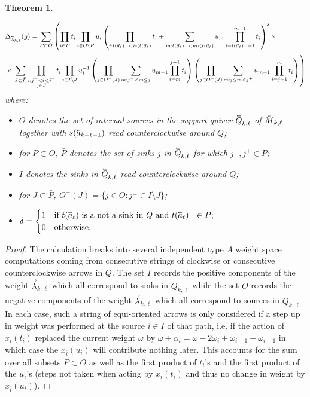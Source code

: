 \documentclass[11pt]{amsart}
\newcommand{\cev}[1]{\reflectbox{\!\ensuremath{\vec{\,\reflectbox{\ensuremath{#1}}}}}}
\newcommand{\scev}[1]{\reflectbox{\scriptsize\!\ensuremath{\vec{\,\reflectbox{\ensuremath{#1}}}}}}
\newtheorem{theorem}{Theorem}[section]
\numberwithin{equation}{section}
\begin{document}
{\begin{theorem}
\begin{enumerate}
      \begin{align}
        &\Delta_{\scev{\lambda}_{k,\ell}}(g)=\sum_{P\subset O}\left(\prod_{i\in P} t_i\prod_{i\in O\setminus P} u_i\left(\prod_{i:t(\vec{a}_\ell)^-<i<t(\vec{a}_\ell)}t_i+\sum_{m:t(\vec{a}_\ell)^-<m<t(\vec{a}_\ell)}u_m\prod_{i=t(\vec{a}_\ell)^-+1}^{m-1} t_i\right)^\delta\times\right.\\
        \nonumber&\times\left.\sum_{J\subset\bar{P}}\prod_{\substack{i:j^-<i<j^+\\j\in J}}t_i\prod_{i\in I\setminus J}u_i^{-1}\left(\prod_{j\in O^-(J)}\sum_{m:j^-<m\le j}u_{m-1}\prod_{i=m}^{j-1} t_i\right)\left(\prod_{j\in O^+(J)}\sum_{m:j\le m<j^+}u_{m+1}\prod_{i=j+1}^{m} t_i\right)\right)
      \end{align}
      where:
      \begin{itemize}
        \item $O$ denotes the set of internal sources in the support quiver $\cev{Q}_{k,\ell}$ of $\cev{M}_{k,\ell}$ together with $s(\cev{a}_{k+\ell-1})$ read counterclockwise around $Q$;
        \item for $P\subset O$, $\bar{P}$ denotes the set of sinks $j$ in $\cev{Q}_{k,\ell}$ for which $j^-,j^+\in P$;
        \item $I$ denotes the sinks in $\cev{Q}_{k,\ell}$ read counterclockwise around $Q$;
        \item for $J\subset\bar{P}$, $O^\pm(J)=\{j\in O:j^\pm\in I\setminus J\}$;
        \item $\delta=\begin{cases}1 & \text{if $t(\cev{a}_\ell)$ is a not a sink in $Q$ and $t(\cev{a}_\ell)^-\in P$;}\\0 & \text{otherwise.}\end{cases}$
      \end{itemize}
    \end{enumerate}
  \end{theorem}
  \begin{proof}
    The calculation breaks into several independent type $A$ weight space computations coming from consecutive strings of clockwise or consecutive counterclockwise arrows in $Q$.  The set $I$ records the positive components of the weight $\vec{\lambda}_{k,\ell}$ which all correspond to sinks in $Q_{k,\ell}$ while the set $O$ records the negative components of the weight $\vec{\lambda}_{k,\ell}$ which all correspond to sources in $Q_{k,\ell}$.  In each case, such a string of equi-oriented arrows is only considered if a step up in weight was performed at the source $i\in I$ of that path, i.e. if the action of $x_i(t_i)$ replaced the current weight $\omega$ by $\omega+\alpha_i=\omega-2\omega_i+\omega_{i-1}+\omega_{i+1}$ in which case the $x_{\bar{i}}(u_i)$ will contribute nothing later.  This accounts for the sum over all subsets $P\subset O$ as well as the first product of $t_i$'s and the first product of the $u_i$'s (steps not taken when acting by $x_i(t_i)$ and thus no change in weight by $x_{\bar{i}}(u_i)$).


\end{proof}}
\end{document}
